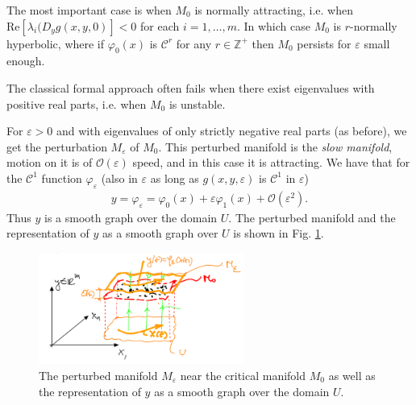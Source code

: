 The most important case is when $M_0$ is normally attracting, i.e. when \newline $ \textrm{Re} [\lambda_i(D_{y}g(x,y,0) ] < 0$ for each $i=1,\ldots, m$.  In which case $M_0$ is $r$-normally hyperbolic, where if $\varphi_0(x)$ is $\mathcal{C}^{r}$ for any $r\in \mathbb{Z}^{+}$ then $M_0$ persists for $\varepsilon$ small enough. 

The classical formal approach often fails when there exist eigenvalues with positive real parts, i.e. when $M_0$ is unstable.

For $\varepsilon>0$ and with eigenvalues of only strictly negative real parts (as before), we get the perturbation $M_\varepsilon$ of $M_0$. This perturbed manifold is the \emph{slow manifold}, motion on it is of $\mathcal{O}(\varepsilon)$ speed, and in this case it is attracting. We have that for the $\mathcal{C}^{1}$ function $\varphi_{\varepsilon}$ (also in $\varepsilon$ as long as $g(x,y,\varepsilon)$ is $\mathcal{C}^{1}$ in $\varepsilon$)
\begin{align}
	y = \varphi_{\varepsilon}= \varphi_0(x) + \varepsilon \varphi_1(x) + \mathcal{O}(\varepsilon^{2}).
\end{align}
Thus $y$ is a smooth graph over the domain $U$. The perturbed manifold and the representation of $y$ as a smooth graph over $U$ is shown in Fig. \ref{fig:singular_perturbed_mfd}.
\begin{figure}[h!]
	\centering
	\includegraphics[width=0.6\textwidth]{figures/ch9/18singular_pert_mfd.png}
	\caption{The perturbed manifold $M_{\varepsilon}$ near the critical manifold $M_0$ as well as the representation of $y$ as a smooth graph over the domain $U$.}
	\label{fig:singular_perturbed_mfd}
\end{figure}

